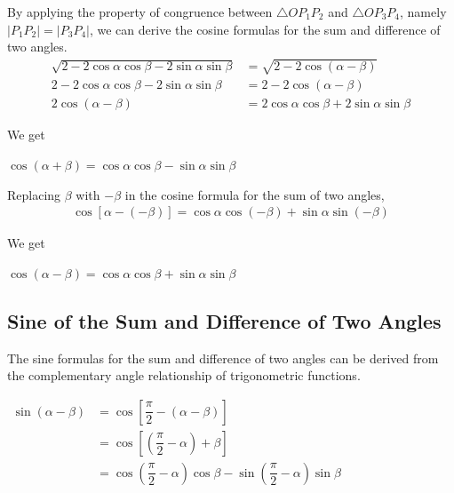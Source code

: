 \documentclass{report}
\begin{document}
By applying the property of congruence between \( \triangle O P_1 P_2 \) and \( \triangle O P_3 P_4 \), namely \( |P_1 P_2| = |P_3 P_4| \), we can derive the cosine formulas for the sum and difference of two angles.
\begin{align*}
	\sqrt{2-2 \cos \alpha \cos \beta-2 \sin \alpha \sin \beta} & =\sqrt{2-2 \cos (\alpha-\beta)} \\ 2-2 \cos \alpha \cos \beta-2 \sin \alpha \sin \beta & =2-2 \cos (\alpha-\beta) \\ 2 \cos (\alpha-\beta) & =2 \cos \alpha \cos \beta+2 \sin \alpha \sin \beta
\end{align*}

\vspace{-2.5em}
We get
\begin{info}
	
	$\cos (\alpha+\beta)=\cos \alpha \cos \beta-\sin \alpha \sin \beta$
\end{info}

Replacing \( \beta \) with \( -\beta \) in the cosine formula for the sum of two angles,    
\begin{align*}
	\cos [\alpha-(-\beta)]=\cos \alpha \cos (-\beta)+\sin \alpha \sin (-\beta) 
\end{align*}

\vspace{-2.5em}
We get
\begin{info}
	
	$\cos (\alpha-\beta)=\cos \alpha \cos \beta+\sin \alpha \sin \beta$
\end{info}

\subsection*{Sine of the Sum and Difference of Two Angles}

The sine formulas for the sum and difference of two angles can be derived from the complementary angle relationship of trigonometric functions.

\noindent $\begin{aligned} \sin (\alpha-\beta) & =\cos \left[\dfrac{\pi}{2}-(\alpha-\beta)\right] \\ & =\cos \left[\left(\dfrac{\pi}{2}-\alpha\right)+\beta\right] \\ & =\cos \left(\dfrac{\pi}{2}-\alpha\right) \cos \beta-\sin \left(\dfrac{\pi}{2}-\alpha\right) \sin \beta\end{aligned}$
\end{document}
